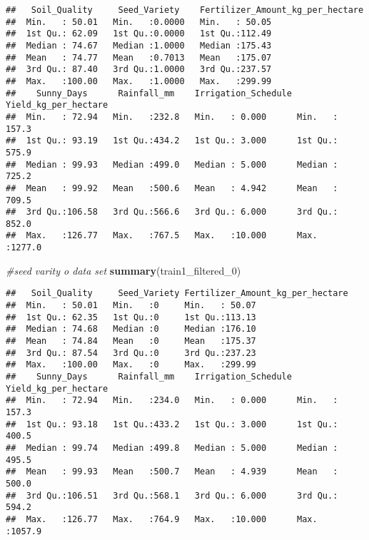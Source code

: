 \documentclass[
]{article}
\newenvironment{Shaded}{\begin{snugshade}}{\end{snugshade}}
\newcommand{\CommentTok}[1]{\textcolor[rgb]{0.56,0.35,0.01}{\textit{#1}}}
\newcommand{\FunctionTok}[1]{\textcolor[rgb]{0.13,0.29,0.53}{\textbf{#1}}}
\newcommand{\NormalTok}[1]{#1}
\begin{document}
\begin{verbatim}
##   Soil_Quality     Seed_Variety    Fertilizer_Amount_kg_per_hectare
##  Min.   : 50.01   Min.   :0.0000   Min.   : 50.05                  
##  1st Qu.: 62.09   1st Qu.:0.0000   1st Qu.:112.49                  
##  Median : 74.67   Median :1.0000   Median :175.43                  
##  Mean   : 74.77   Mean   :0.7013   Mean   :175.07                  
##  3rd Qu.: 87.40   3rd Qu.:1.0000   3rd Qu.:237.57                  
##  Max.   :100.00   Max.   :1.0000   Max.   :299.99                  
##    Sunny_Days      Rainfall_mm    Irrigation_Schedule Yield_kg_per_hectare
##  Min.   : 72.94   Min.   :232.8   Min.   : 0.000      Min.   : 157.3      
##  1st Qu.: 93.19   1st Qu.:434.2   1st Qu.: 3.000      1st Qu.: 575.9      
##  Median : 99.93   Median :499.0   Median : 5.000      Median : 725.2      
##  Mean   : 99.92   Mean   :500.6   Mean   : 4.942      Mean   : 709.5      
##  3rd Qu.:106.58   3rd Qu.:566.6   3rd Qu.: 6.000      3rd Qu.: 852.0      
##  Max.   :126.77   Max.   :767.5   Max.   :10.000      Max.   :1277.0
\end{verbatim}

\begin{Shaded}
\begin{Highlighting}[]
\CommentTok{\#seed varity o data set}
\FunctionTok{summary}\NormalTok{(train1\_filtered\_0)}
\end{Highlighting}
\end{Shaded}

\begin{verbatim}
##   Soil_Quality     Seed_Variety Fertilizer_Amount_kg_per_hectare
##  Min.   : 50.01   Min.   :0     Min.   : 50.07                  
##  1st Qu.: 62.35   1st Qu.:0     1st Qu.:113.13                  
##  Median : 74.68   Median :0     Median :176.10                  
##  Mean   : 74.84   Mean   :0     Mean   :175.37                  
##  3rd Qu.: 87.54   3rd Qu.:0     3rd Qu.:237.23                  
##  Max.   :100.00   Max.   :0     Max.   :299.99                  
##    Sunny_Days      Rainfall_mm    Irrigation_Schedule Yield_kg_per_hectare
##  Min.   : 72.94   Min.   :234.0   Min.   : 0.000      Min.   : 157.3      
##  1st Qu.: 93.18   1st Qu.:433.2   1st Qu.: 3.000      1st Qu.: 400.5      
##  Median : 99.74   Median :499.8   Median : 5.000      Median : 495.5      
##  Mean   : 99.93   Mean   :500.7   Mean   : 4.939      Mean   : 500.0      
##  3rd Qu.:106.51   3rd Qu.:568.1   3rd Qu.: 6.000      3rd Qu.: 594.2      
##  Max.   :126.77   Max.   :764.9   Max.   :10.000      Max.   :1057.9
\end{verbatim}
\end{document}
